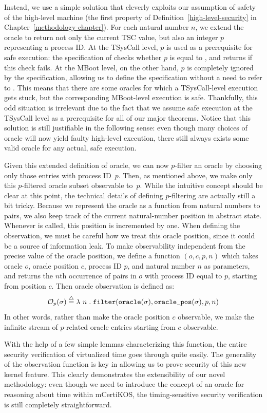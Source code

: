 Instead, we use a simple solution that cleverly exploits our
assumption of safety of the high-level machine (the first
property of Definition~\ref{high-level-security} in 
Chapter~\ref{methodology-chapter}). For each natural
number $n$, we extend the oracle to return not only the
current TSC value, but also an integer $p$ representing a process
ID. At the TSysCall level, $p$ is used as a prerequisite for safe
execution: the specification of \gett{} checks whether $p$ is
equal to , and returns \none{} if this check fails.
At the MBoot level, on the other hand, $p$ is completely ignored
by the  specification, allowing us to define the
specification without a need to refer to . This means that there are
some oracles for which a TSysCall-level execution gets stuck, but
the corresponding MBoot-level execution is safe. Thankfully, this 
odd situation is irrelevant due to the fact that we assume safe
execution at the TSysCall level as a prerequisite for all of our
major theorems. Notice that
this solution is still justifiable in the following sense: even
though many choices of oracle will now yield faulty high-level 
execution, there still always exists some valid oracle for any 
actual, safe execution.

Given this extended definition of oracle, we can now 
$p$-filter an oracle by choosing only those entries with process
ID~$p$. Then, as mentioned above, we make only this $p$-filtered
oracle subset observable to~$p$. While the intuitive concept should
be clear at this point, the technical details of defining 
$p$-filtering are actually still a bit tricky. Because we represent
the oracle as a function from natural numbers to pairs, we also
keep track of the current natural-number position in abstract state.
Whenever  is called, this position is incremented
by one. When defining the observation, we must be careful how we
treat this oracle position, since it could be a source of information leak.
To make observability independent from the precise value of the oracle 
position, we define a function $(o,c,p,n)$ which takes oracle 
$o$, oracle position $c$, process ID $p$, and natural number $n$ as parameters, 
and returns the $n$th occurrence of pairs in $o$ with process ID equal
to $p$, starting from position $c$. Then oracle observation is defined 
as:
\[\mathcal{O}_{p}(\sigma) \stackrel{\triangle}{=} \lambda~n \hspace{1mm} . \hspace{1mm} \text{\tt{filter}}(\text{\tt{oracle}}(\sigma),
\text{\tt{oracle\_pos}}(\sigma),p,n)\]
In other words, rather than make the oracle position $c$ 
observable, we make the infinite stream of $p$-related
oracle entries starting from $c$ observable. 

With the help of a few simple lemmas characterizing this 
 function, the entire security verification of virtualized 
time goes through quite easily. The generality of the observation
function is key in allowing us to prove security of this new kernel feature.
This clearly demonstrates the extensibility of our novel methodology: even 
though we need to introduce the concept of an oracle for reasoning about
time within mCertiKOS, the timing-sensitive security verification
is still completely straightforward.





